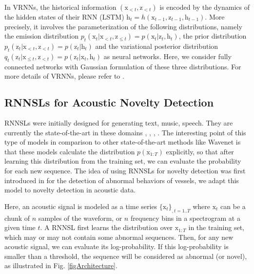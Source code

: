 \documentclass{article}
\begin{document}
In VRNNs, the historical information $(\boldsymbol{\mathrm{x}}_{<t},\boldsymbol{\mathrm{z}}_{<t})$ is encoded by the dynamics of the hidden states of their RNN (LSTM) $\boldsymbol{\mathrm{h}}_t = h(\boldsymbol{\mathrm{x}}_{t-1},\boldsymbol{\mathrm{z}}_{t-1},\boldsymbol{\mathrm{h}}_{t-1})$. 
More precisely, it involves the parameterization of the following distributions, namely 
the emission distribution  $p_t(\boldsymbol{\mathrm{x}}_t|\boldsymbol{\mathrm{x}}_{<t},\boldsymbol{\mathrm{z}}_{ \leq t}) = p(\boldsymbol{\mathrm{x}}_t|\boldsymbol{\mathrm{z}}_t, \boldsymbol{\mathrm{h}}_t)$, the prior distribution  $p_t(\boldsymbol{\mathrm{z}}_t|\boldsymbol{\mathrm{x}}_{<t},\boldsymbol{\mathrm{z}}_{<t}) = p(\boldsymbol{\mathrm{z}}_t|\boldsymbol{\mathrm{h}}_t)$ and the variational posterior distribution $q_t(\boldsymbol{\mathrm{z}}_t|\boldsymbol{\mathrm{x}}_{ \leq t},\boldsymbol{\mathrm{z}}_{<t}) = p(\boldsymbol{\mathrm{z}}_t|\boldsymbol{\mathrm{x}}_t,\boldsymbol{\mathrm{h}}_t)$ as neural networks.
Here, we consider fully connected networks with Gaussian formulation of these three distributions. For more details of VRNNs, please refer to \cite{chung_recurrent_2015}.


\subsection{RNNSLs for Acoustic Novelty Detection}
\label{secRNNSLsforAcousticNoveltyDetection}
RNNSLs were initially designed for generating text, music, speech. They are currently the state-of-the-art in these domains \cite{boulanger-lewandowski_modeling_2012}, \cite{chung_recurrent_2015}, \cite{fraccaro_sequential_2016}, \cite{maddison_filtering_2017}. The interesting point of this type of models in comparison to other state-of-the-art methods like Wavenet \cite{oord_wavenet:_2016} is that these models calculate the distribution $p(\boldsymbol{\mathrm{x}}_{1:T})$ explicitly, so that after learning this distribution from the training set, we can evaluate the probability for each new sequence. The idea of using RNNSLs for novelty detection was first introduced in \cite{nguyen_multi-task_2018} for the detection of abnormal behaviors of vessels, we adapt this model to novelty detection in acoustic data.

Here, an acoustic signal is modeled as a time series $\{ \boldsymbol{\mathrm{x}}_{t} \}_{, t = 1..T}$  where $\boldsymbol{\mathrm{x}}_t$ can be a chunk of $n$ samples of the waveform, or $n$ frequency bins  in a spectrogram at a given time $t$. A RNNSL first learns the distribution over $\boldsymbol{\mathrm{x}}_{1:T}$ in the training set, which may or may not contain some abnormal sequences. Then, for any new acoustic signal, we can evaluate its log-probability.
If this log-probability is smaller than a threshold, the sequence will be considered as abnormal (or novel), as illustrated in Fig. \ref{figArchitecture}.
 
\end{document}
